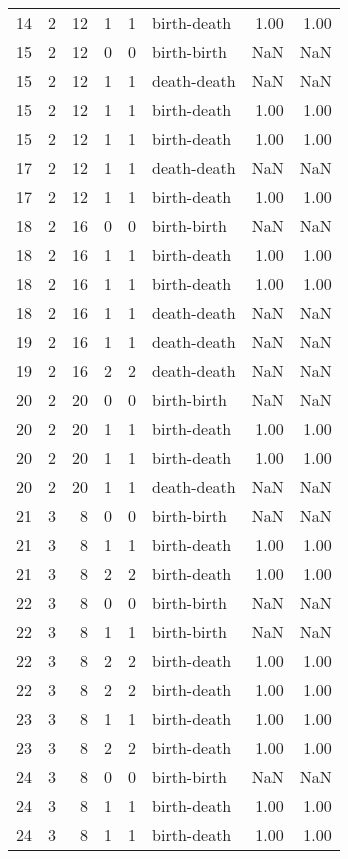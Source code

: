 \documentclass{article}
\begin{document}
\begin{center}
\begin{tabular}{rrrrrlrr}
14 & 2 & 12 & 1 & 1 & birth-death & 1.00 & 1.00 \\
15 & 2 & 12 & 0 & 0 & birth-birth & NaN & NaN \\
15 & 2 & 12 & 1 & 1 & death-death & NaN & NaN \\
15 & 2 & 12 & 1 & 1 & birth-death & 1.00 & 1.00 \\
15 & 2 & 12 & 1 & 1 & birth-death & 1.00 & 1.00 \\
17 & 2 & 12 & 1 & 1 & death-death & NaN & NaN \\
17 & 2 & 12 & 1 & 1 & birth-death & 1.00 & 1.00 \\
18 & 2 & 16 & 0 & 0 & birth-birth & NaN & NaN \\
18 & 2 & 16 & 1 & 1 & birth-death & 1.00 & 1.00 \\
18 & 2 & 16 & 1 & 1 & birth-death & 1.00 & 1.00 \\
18 & 2 & 16 & 1 & 1 & death-death & NaN & NaN \\
19 & 2 & 16 & 1 & 1 & death-death & NaN & NaN \\
19 & 2 & 16 & 2 & 2 & death-death & NaN & NaN \\
20 & 2 & 20 & 0 & 0 & birth-birth & NaN & NaN \\
20 & 2 & 20 & 1 & 1 & birth-death & 1.00 & 1.00 \\
20 & 2 & 20 & 1 & 1 & birth-death & 1.00 & 1.00 \\
20 & 2 & 20 & 1 & 1 & death-death & NaN & NaN \\
21 & 3 & 8 & 0 & 0 & birth-birth & NaN & NaN \\
21 & 3 & 8 & 1 & 1 & birth-death & 1.00 & 1.00 \\
21 & 3 & 8 & 2 & 2 & birth-death & 1.00 & 1.00 \\
22 & 3 & 8 & 0 & 0 & birth-birth & NaN & NaN \\
22 & 3 & 8 & 1 & 1 & birth-birth & NaN & NaN \\
22 & 3 & 8 & 2 & 2 & birth-death & 1.00 & 1.00 \\
22 & 3 & 8 & 2 & 2 & birth-death & 1.00 & 1.00 \\
23 & 3 & 8 & 1 & 1 & birth-death & 1.00 & 1.00 \\
23 & 3 & 8 & 2 & 2 & birth-death & 1.00 & 1.00 \\
24 & 3 & 8 & 0 & 0 & birth-birth & NaN & NaN \\
24 & 3 & 8 & 1 & 1 & birth-death & 1.00 & 1.00 \\
24 & 3 & 8 & 1 & 1 & birth-death & 1.00 & 1.00 \\

\end{tabular}
\end{center}
\end{document}
